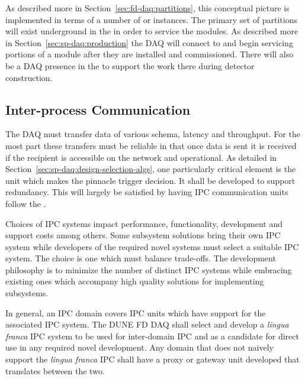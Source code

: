 
As described more in Section~\ref{sec:fd-daq:partitions}, this conceptual picture is implemented in terms of a number of  or instances. 
The primary set of partitions will exist underground in the  in order to service the  modules. 
As described more in Section~\ref{sec:sp-daq:production} the DAQ will connect to and begin servicing portions of a  module after they are installed and commissioned. 
There will also be a DAQ presence in the  to support the work there during detector construction.




  



\subsection{Inter-process Communication}
\label{sec:fd-daq:design-messages}

The DAQ must transfer data of various schema, latency and throughput. 
For the most part these transfers must be reliable in that once data is sent it is received if the recipient is accessible on the network and operational. 
As detailed in Section~\ref{sec:sp-daq:design-selection-algs}, one particularly critical element is the unit which makes the pinnacle trigger decision. 
It shall be developed to support redundancy. 
This will largely be satisfied by having IPC communication units follow the .


Choices of IPC systems impact performance, functionality, development and support costs among others. 
Some subsystem solutions bring their own IPC system while developers of the required novel systems must select a suitable IPC system. 
The choice is one which must balance trade-offs. 
The development philosophy is to minimize the number of distinct IPC systems while embracing existing ones which accompany high quality solutions for implementing subsystems.

In general, an IPC domain covers IPC units which have support for the associated IPC system. 
The DUNE FD DAQ shall select and develop a \textit{lingua franca} IPC system to be used for inter-domain IPC and as a candidate for direct use in any required novel development.  Any domain that does not naively support the \textit{lingua franca} IPC shall have a proxy or gateway unit developed that translates between the two.

